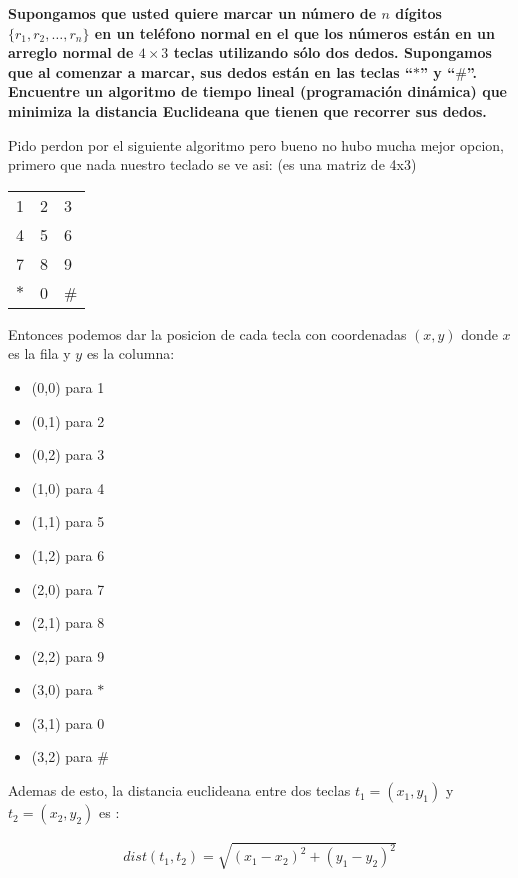 \textbf{Supongamos que usted quiere marcar un n\'umero de $n$ d\'igitos $\{r_1, r_2, \dots, r_n\}$ en un tel\'efono normal en el que los n\'umeros est\'an en un arreglo normal de $4 \times 3$ teclas utilizando s\'olo dos dedos. Supongamos que al comenzar a marcar, sus dedos est\'an en las teclas ``$*$'' y ``$\#$''. Encuentre un algoritmo de tiempo lineal (programaci\'on din\'amica) que minimiza la distancia Euclideana que tienen que recorrer sus dedos.}\vspace{.2cm}


Pido perdon por el siguiente algoritmo pero bueno no hubo mucha mejor opcion, primero que nada nuestro teclado se ve asi: (es una matriz de 4x3) \vspace{.2cm}
\begin{table}[H]
    \centering
    \begin{tabular}{lll}
        1 & 2 & 3 \\
        4 & 5 & 6 \\
        7 & 8 & 9 \\
        $\ast$ & 0 & \#
        \end{tabular}
\end{table}

Entonces podemos dar la posicion de cada tecla con coordenadas $(x,y)$ donde $x$ es la fila y $y$ es la columna:
\begin{itemize}
    \item (0,0) para 1
    \item (0,1) para 2
    \item (0,2) para 3
    \item (1,0) para 4
    \item (1,1) para 5
    \item (1,2) para 6
    \item (2,0) para 7
    \item (2,1) para 8
    \item (2,2) para 9
    \item (3,0) para $\ast$
    \item (3,1) para 0
    \item (3,2) para \#
\end{itemize}

Ademas de esto, la distancia euclideana entre dos teclas $t_1 = (x_1,y_1)$ y $t_2 = (x_2,y_2)$ es :

\begin{align*} 
    dist(t_1,t_2) = \sqrt{(x_1-x_2)^2 + (y_1-y_2)^2}
\end{align*}

